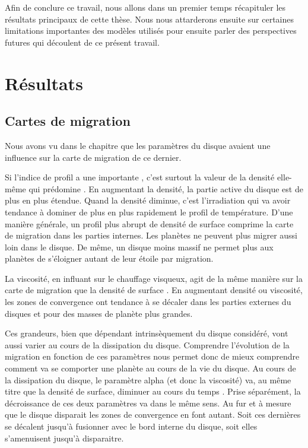 Afin de conclure ce travail, nous allons dans un premier temps récapituler les résultats principaux de cette thèse. Nous nous attarderons ensuite sur certaines limitations importantes des modèles utilisés pour ensuite parler des perspectives futures qui découlent de ce présent travail. 

\section{Résultats}
\subsection{Cartes de migration}
Nous avons vu dans le chapitre  que les paramètres du disque avaient une influence sur la carte de migration de ce dernier. 

Si l'indice de profil a une importante , c'est surtout la valeur de la densité elle-même qui prédomine . En augmentant la densité, la partie active du disque est de plus en plus étendue. Quand la densité diminue, c'est l'irradiation qui va avoir tendance à dominer de plus en plus rapidement le profil de température. D'une manière générale, un profil plus abrupt de densité de surface comprime la carte de migration dans les parties internes. Les planètes ne peuvent plus migrer aussi loin dans le disque. De même, un disque moins massif ne permet plus aux planètes de s'éloigner autant de leur étoile par migration. 

La viscosité, en influant sur le chauffage visqueux, agit de la même manière sur la carte de migration que la densité de surface . En augmentant densité ou viscosité, les zones de convergence ont tendance à se décaler dans les parties externes du disques et pour des masses de planète plus grandes. 

Ces grandeurs, bien que dépendant intrinsèquement du disque considéré, vont aussi varier au cours de la dissipation du disque. Comprendre l'évolution de la migration en fonction de ces paramètres nous permet donc de mieux comprendre comment va se comporter une planète au cours de la vie du disque. Au cours de la dissipation du disque, le paramètre alpha (et donc la viscosité) va, au même titre que la densité de surface, diminuer au cours du temps \citep[Fig. 16]{guilloteau2011dual}. Prise séparément, la décroissance de ces deux paramètres va dans le même sens. Au fur et à mesure que le disque disparait les zones de convergence en font autant. Soit ces dernières se décalent jusqu'à fusionner avec le bord interne du disque, soit elles s'amenuisent jusqu'à disparaitre.

